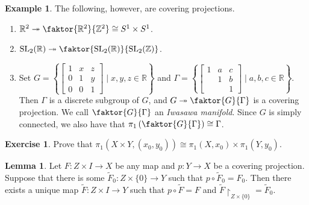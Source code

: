 \documentclass[10pt,letterpaper,cm]{nupset}
\theoremstyle{definition}
\newtheorem{exmp}[definition]{Example}
\theoremstyle{theorem}
\newtheorem{lemma}[definition]{Lemma}
\newtheorem{exercise}[definition]{Exercise}
\theoremstyle{remark}
\newcommand{\R}{\mathbb{R}}
\newcommand{\Z}{\mathbb Z}
\newcommand{\1}{\mathbb{1}}
\newcommand{\0}{\vec 0}
\DeclareMathOperator{\SL}{SL}
\begin{document}
\begin{exmp} The following, however, are covering projections.
\begin{enumerate}
\item $\R^2 \twoheadrightarrow \faktor{\R^2}{\Z^2} \cong S^1 \times S^1$.
\item $\SL_2(\R) \twoheadrightarrow \faktor{\SL_2(\R)}{\SL_2(\Z)}$.
\item Set $G = \left \{ \begin{bmatrix} 1 & x & z \\ 0 & 1 & y \\ 0 & 0 & 1 \end{bmatrix}  \mid x,y,z \in \R \right \}$ and $\Gamma = \left \{ \begin{bmatrix} 1 & a & c \\  & 1 & b \\  &  & 1 \end{bmatrix} \mid a,b,c \in \R \right \}$. Then $\Gamma$ is a discrete subgroup of $G$, and $G \twoheadrightarrow \faktor{G}{\Gamma}$ is a covering projection. We call $\faktor{G}{\Gamma}$ an \textit{Iwasawa manifold}.
Since $G$ is simply connected, we also have that $\pi_1 \left(\faktor{G}{\Gamma} \right) \cong \Gamma$.
\end{enumerate}
\end{exmp}

\begin{exercise}
Prove that $\pi_1(X \times Y, (x_0, y_0)) \cong \pi_1\left(X, x_0\right) \times \pi_1\left(Y, y_0\right)$.
\end{exercise}

\begin{lemma}
Let $F : Z \times I \to X$ be any map and $p: Y \to X$ be a covering projection. Suppose that there is some $\widetilde{F}_0 : Z \times \{0\} \to Y$ such that $p \circ \widetilde{F}_0 = F_0$. Then there exists a unique map $\widetilde{F} : Z \times I \to Y$ such that $p \circ \widetilde{F} = F$ and $\widetilde{F} \restriction_{Z\times \{0\}} = \widetilde{F}_0$.
\end{lemma}
\end{document}
